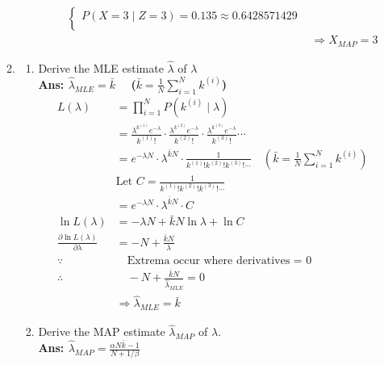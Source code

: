\documentclass{article}
\theoremstyle{definition}
\theoremstyle{remark}
\begin{document}
\begin{enumerate}[font={\Large\bfseries},left=0pt]
\begin{tcolorbox}
\begin{enumerate}
\begin{enumerate}
\begin{enumerate}
\begin{align}
\begin{cases}
                    P(X = 3 \mid Z = 3) = 0.135 \approx 0.6428571429 \\      
                \end{cases} \\
                &\Rightarrow X_{MAP} = 3
                \end{align}
            \end{enumerate}
        \end{enumerate}
    \item \begin{enumerate}
        \item Derive the MLE estimate $\hat{\lambda}$ of $\lambda$\\
        \textbf{Ans: $\hat{\lambda}_{MLE} = \bar{k} \quad$ ($\bar{k} = \frac{1}{N}\sum^N_{i=1}k^{(i)}$)} \\
        \begin{align}
        L(\lambda) &= \prod^N_{i = 1} P(k^{(i)} \mid \lambda) \\
                   &= \frac{\lambda^{k^{(1)}}e^{-\lambda}}{k^{(1)}!} \cdot \frac{\lambda^{k^{(2)}}e^{-\lambda}}{k^{(2)}!} \cdot \frac{\lambda^{k^{(3)}}e^{-\lambda}}{k^{(3)}!} \cdots \\
                   &= e^{-\lambda N} \cdot \lambda^{\bar{k}N} \cdot \frac{1}{k^{(1)}!k^{(2)}!k^{(3)}! \cdots} \quad (\bar{k} = \frac{1}{N}\sum^N_{i=1}k^{(i)}) \\
                   &\text{Let } C = \frac{1}{k^{(1)}!k^{(2)}!k^{(3)}! \cdots } \\
                   &= e^{-\lambda N} \cdot \lambda^{\bar{k}N} \cdot C \\
    \ln L(\lambda) &= -\lambda N + \bar{k}N\ln \lambda + \ln C \\
    \frac{\partial \ln L(\lambda)}{\partial \lambda} &= -N + \frac{\bar{k}N}{\lambda} \\
                    \because &\quad\text{Extrema occur where derivatives = 0} \\
                    \therefore &\quad -N + \frac{\bar{k}N}{\hat{\lambda}_{MLE}} = 0 \\
                    &\Rightarrow \hat{\lambda}_{MLE} = \bar{k}
        \end{align}
        \item Derive the MAP estimate $\hat{\lambda}_{MAP}$ of $\lambda$. \\
        \textbf{Ans: $\hat{\lambda}_{{MAP}} = \frac{\alpha N\bar{k} - 1}{N + 1/\beta}$} \\
        

\end{enumerate}
\end{enumerate}
\end{tcolorbox}
\end{enumerate}
\end{document}
